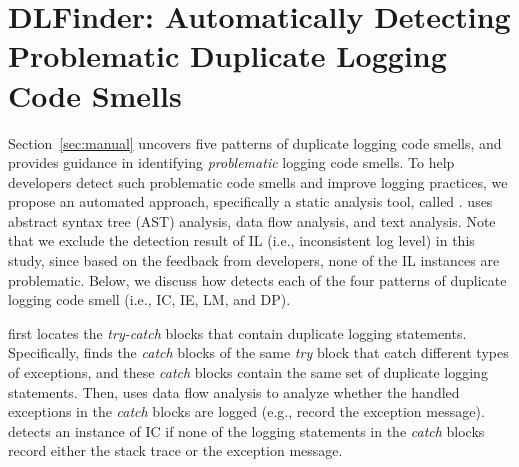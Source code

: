 \section{DLFinder: Automatically Detecting Problematic Duplicate Logging Code Smells}
\label{sec:detection}



Section~\ref{sec:manual} uncovers five patterns of duplicate logging code smells, and provides guidance in identifying {\em problematic} logging code smells. 
To help developers detect such problematic code smells and improve logging practices, we propose an automated approach, specifically a static analysis tool, called \tool. \toolS uses abstract syntax tree (AST) analysis, data flow analysis, and text analysis. Note that we exclude the detection result of IL (i.e., inconsistent log level) in this study, since based on the feedback from developers, none of the IL instances are problematic. Below, we discuss how \toolS detects each of the four patterns of duplicate logging code smell (i.e., IC, IE, LM, and DP).



\toolS first locates the {\em try-catch} blocks that contain duplicate logging statements. Specifically, \toolS finds the {\em catch} blocks of the same {\em try} block that catch different types of exceptions, and these {\em catch} blocks contain the same set of duplicate logging statements. Then, \toolS uses data flow analysis to analyze whether the handled exceptions in the {\em catch} blocks are logged (e.g., record the exception message). \toolS detects an instance of IC if none of the logging statements in the {\em catch} blocks record either the stack trace or the exception message.




